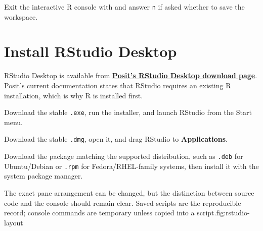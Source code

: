 Exit the interactive R console with  and answer \texttt{n} if asked whether to save the workspace.

\section{Install RStudio Desktop}

RStudio Desktop is available from \href{https://posit.co/download/rstudio-desktop/}{\textbf{Posit's RStudio Desktop download page}}. Posit's current documentation states that RStudio requires an existing R installation, which is why R is installed first.

\begin{description}[leftmargin=1.25in,style=nextline]
  \item[Windows] Download the stable \texttt{.exe}, run the installer, and launch RStudio from the Start menu.
  \item[macOS] Download the stable \texttt{.dmg}, open it, and drag RStudio to \textbf{Applications}.
  \item[Linux] Download the package matching the supported distribution, such as \texttt{.deb} for Ubuntu/Debian or \texttt{.rpm} for Fedora/RHEL-family systems, then install it with the system package manager.
\end{description}

\begin{utpfig}{The exact pane arrangement can be changed, but the distinction between source code and the console should remain clear. Saved scripts are the reproducible record; console commands are temporary unless copied into a script.}{fig:rstudio-layout}
\end{utpfig}

